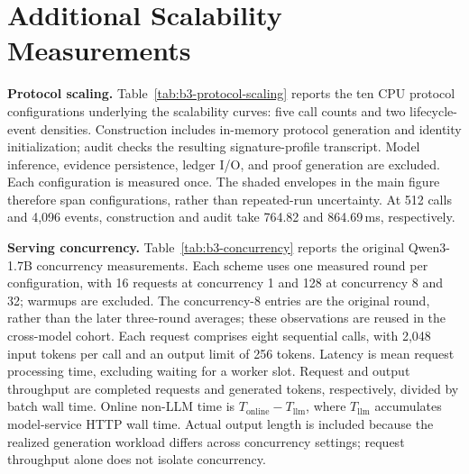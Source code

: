 \section{Additional Scalability Measurements}
\label{app:b3-scalability}
\label{app:b3-concurrency}

\noindent\textbf{Protocol scaling.}
Table~\ref{tab:b3-protocol-scaling} reports the ten CPU protocol configurations
underlying the scalability curves: five call counts and two lifecycle-event
densities. Construction includes in-memory protocol generation and identity
initialization; audit checks the resulting signature-profile transcript.
Model inference, evidence persistence, ledger I/O, and proof generation are excluded.
Each configuration is measured once. The shaded envelopes in the main figure
therefore span configurations, rather than repeated-run uncertainty.
At 512 calls and 4,096 events, construction and audit take 764.82 and 864.69\,ms,
respectively.


\noindent\textbf{Serving concurrency.}
Table~\ref{tab:b3-concurrency} reports the original Qwen3-1.7B concurrency
measurements. Each scheme uses one measured round per configuration, with 16
requests at concurrency 1 and 128 at concurrency 8 and 32; warmups are excluded.
The concurrency-8 entries are the original round, rather than the later
three-round averages; these observations are reused in the cross-model cohort.
Each request comprises eight sequential calls, with
2,048 input tokens per call and an output limit of 256 tokens.
Latency is mean request processing time, excluding waiting for a worker slot.
Request and output throughput
are completed requests and generated tokens, respectively, divided by batch wall time.
Online non-LLM time is $T_{\mathrm{online}}-T_{\mathrm{llm}}$, where
$T_{\mathrm{llm}}$ accumulates model-service HTTP wall time.
Actual output length is included because the realized generation workload differs
across concurrency settings; request throughput alone does not isolate concurrency.

